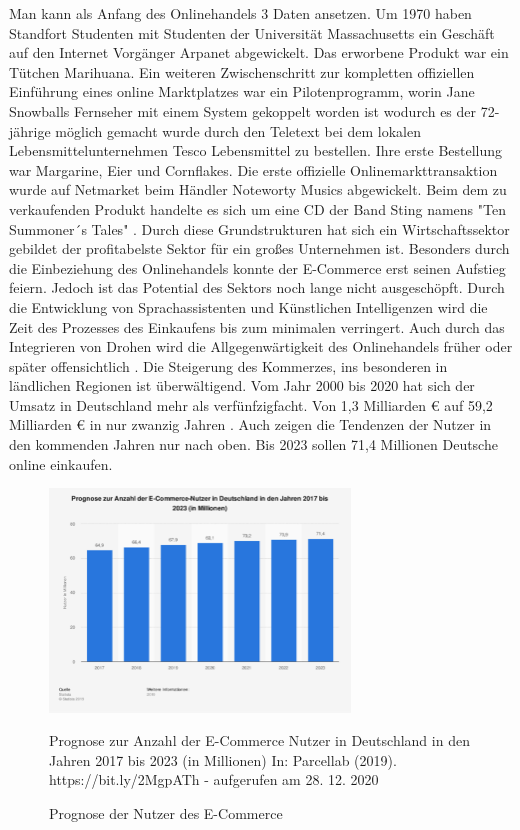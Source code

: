 Man kann als Anfang des Onlinehandels 3 Daten ansetzen. Um 1970 haben Standfort Studenten mit Studenten der Universität Massachusetts ein Geschäft auf den Internet Vorgänger Arpanet abgewickelt. Das erworbene Produkt war ein Tütchen Marihuana. Ein weiteren Zwischenschritt zur kompletten offiziellen Einführung eines online Marktplatzes war ein Pilotenprogramm, worin Jane Snowballs Fernseher mit einem System gekoppelt worden ist wodurch es der 72-jährige möglich gemacht wurde durch den Teletext bei dem lokalen Lebensmittelunternehmen Tesco Lebensmittel zu bestellen. Ihre erste Bestellung war Margarine, Eier und Cornflakes. Die erste offizielle Onlinemarkttransaktion wurde auf Netmarket beim Händler Noteworty Musics abgewickelt. Beim dem zu verkaufenden Produkt handelte es sich um eine CD der Band Sting namens "Ten Summoner´s Tales" \cite{bihler}. Durch diese Grundstrukturen hat sich ein Wirtschaftssektor gebildet der profitabelste Sektor für ein großes Unternehmen ist. Besonders durch die Einbeziehung des Onlinehandels konnte der E-Commerce erst seinen Aufstieg feiern. Jedoch ist das Potential des Sektors noch lange nicht ausgeschöpft. Durch die Entwicklung von Sprachassistenten und Künstlichen Intelligenzen wird die Zeit des Prozesses des Einkaufens bis zum minimalen verringert. Auch durch das Integrieren von Drohen wird die Allgegenwärtigkeit des Onlinehandels früher oder später offensichtlich \cite{leopold}. Die Steigerung des Kommerzes, ins besonderen in ländlichen Regionen ist überwältigend. Vom Jahr 2000 bis 2020 hat sich der Umsatz in Deutschland mehr als verfünfzigfacht. Von 1,3 Milliarden € auf 59,2 Milliarden € in nur zwanzig Jahren \cite{poleshov}. Auch zeigen die Tendenzen der Nutzer in den kommenden Jahren nur nach oben. Bis 2023 sollen 71,4 Millionen Deutsche online einkaufen.

 \begin{figure}[h]
    \begin{center}
        \includegraphics[width=8cm]{media/1.png}
        \caption{Prognose der Nutzer des E-Commerce}
        \label{Prognose Nutzer}
        \bildquelle  Prognose zur Anzahl der E-Commerce Nutzer in Deutschland in den Jahren 2017 bis 2023 (in Millionen) In: Parcellab (2019). https://bit.ly/2MgpATh - aufgerufen am 28. 12. 2020
    \end{center}
\end{figure}



